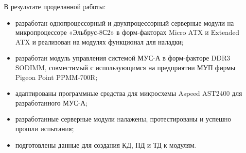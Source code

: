 
В результате проделанной работы:
\begin{itemize}
	\item разработан однопроцессорный и двухпроцессорный серверные модули на микропроцессоре «Эльбрус-8С2» в форм-факторах Micro ATX и Extended ATX и реализован на модулях функционал для наладки;
	\item разработан модуль управления системой МУС-А в форм-факторе DDR3 SODIMM, совместимый с использующимся на предприятии МУП фирмы Pigeon Point PPMM-700R; 
	\item адаптированы программные средства для микросхемы Aspeed AST2400 для разработанного МУС-А;
	\item разработанные серверные модули налажены, протестированы и успешно прошли испытания;
	\item подготовлены данные для создания КД, ПД и ТД к модулям.
\end{itemize}

\clearpage
